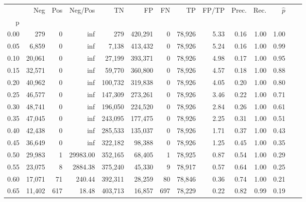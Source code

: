 \begin{tabular}{rrrrrrrrrrrrrr}
\toprule
{} &     Neg &     Pos &   Neg/Pos &       TN &       FP &      FN &      TP & FP/TP & Prec. &  Rec. & $\hat{p}$ \\
p    &         &         &           &          &          &         &         &       &       &       &           \\
\midrule
0.00 &     279 &       0 &       inf &      279 &  420,291 &       0 &  78,926 &  5.33 &  0.16 &  1.00 &      1.00 \\
0.05 &   6,859 &       0 &       inf &    7,138 &  413,432 &       0 &  78,926 &  5.24 &  0.16 &  1.00 &      0.99 \\
0.10 &  20,061 &       0 &       inf &   27,199 &  393,371 &       0 &  78,926 &  4.98 &  0.17 &  1.00 &      0.95 \\
0.15 &  32,571 &       0 &       inf &   59,770 &  360,800 &       0 &  78,926 &  4.57 &  0.18 &  1.00 &      0.88 \\
0.20 &  40,962 &       0 &       inf &  100,732 &  319,838 &       0 &  78,926 &  4.05 &  0.20 &  1.00 &      0.80 \\
0.25 &  46,577 &       0 &       inf &  147,309 &  273,261 &       0 &  78,926 &  3.46 &  0.22 &  1.00 &      0.71 \\
0.30 &  48,741 &       0 &       inf &  196,050 &  224,520 &       0 &  78,926 &  2.84 &  0.26 &  1.00 &      0.61 \\
0.35 &  47,045 &       0 &       inf &  243,095 &  177,475 &       0 &  78,926 &  2.25 &  0.31 &  1.00 &      0.51 \\
0.40 &  42,438 &       0 &       inf &  285,533 &  135,037 &       0 &  78,926 &  1.71 &  0.37 &  1.00 &      0.43 \\
0.45 &  36,649 &       0 &       inf &  322,182 &   98,388 &       0 &  78,926 &  1.25 &  0.45 &  1.00 &      0.35 \\
0.50 &  29,983 &       1 &  29983.00 &  352,165 &   68,405 &       1 &  78,925 &  0.87 &  0.54 &  1.00 &      0.29 \\
0.55 &  23,075 &       8 &   2884.38 &  375,240 &   45,330 &       9 &  78,917 &  0.57 &  0.64 &  1.00 &      0.25 \\
0.60 &  17,071 &      71 &    240.44 &  392,311 &   28,259 &      80 &  78,846 &  0.36 &  0.74 &  1.00 &      0.21 \\
0.65 &  11,402 &     617 &     18.48 &  403,713 &   16,857 &     697 &  78,229 &  0.22 &  0.82 &  0.99 &      0.19 \\

\end{tabular}
